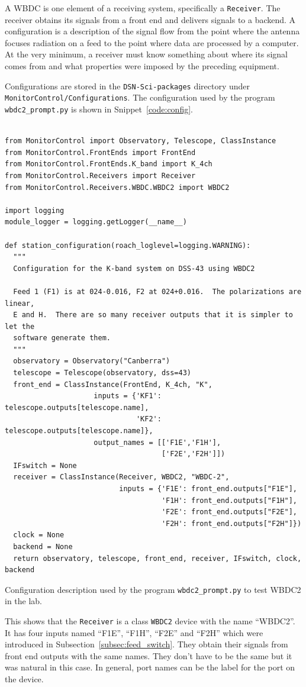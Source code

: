 \documentclass[letterpaper,11pt]{book}
\begin{document}
A WBDC is one element of a receiving system, specifically a {\tt Receiver}.  The
receiver obtains its signals from a front end and delivers signals to a 
backend.  A configuration is a description of the signal flow from the point
where the antenna focuses radiation on a feed to the point where data are
processed by a computer.  At the very minimum, a receiver must know something
about where its signal comes from and what properties were imposed by the
preceding equipment.

Configurations are stored in the {\tt DSN-Sci-packages} directory under\linebreak
{\tt MonitorControl/Configurations}.  The configuration used by the 
program {\tt wbdc2\_prompt.py} is shown in Snippet~\ref{code:config}.
\begin{code}[h!tb]
\begin{center}
\begin{verbatim}

from MonitorControl import Observatory, Telescope, ClassInstance
from MonitorControl.FrontEnds import FrontEnd
from MonitorControl.FrontEnds.K_band import K_4ch
from MonitorControl.Receivers import Receiver
from MonitorControl.Receivers.WBDC.WBDC2 import WBDC2

import logging
module_logger = logging.getLogger(__name__)

def station_configuration(roach_loglevel=logging.WARNING):
  """
  Configuration for the K-band system on DSS-43 using WBDC2

  Feed 1 (F1) is at 024-0.016, F2 at 024+0.016.  The polarizations are linear,
  E and H.  There are so many receiver outputs that it is simpler to let the
  software generate them.
  """
  observatory = Observatory("Canberra")
  telescope = Telescope(observatory, dss=43)
  front_end = ClassInstance(FrontEnd, K_4ch, "K",
                     inputs = {'KF1': telescope.outputs[telescope.name],
                               'KF2': telescope.outputs[telescope.name]},
                     output_names = [['F1E','F1H'],
                                     ['F2E','F2H']])
  IFswitch = None
  receiver = ClassInstance(Receiver, WBDC2, "WBDC-2",
                           inputs = {'F1E': front_end.outputs["F1E"],
                                     'F1H': front_end.outputs["F1H"],
                                     'F2E': front_end.outputs["F2E"],
                                     'F2H': front_end.outputs["F2H"]})
  clock = None
  backend = None
  return observatory, telescope, front_end, receiver, IFswitch, clock, backend\end{verbatim}
\caption[Configuration used by {\tt wbdc2\_prompt.py}]{\label{code:config}
Configuration description used by the program
{\tt wbdc2\_prompt.py} to test WBDC2 in the lab.}
\end{center}
\end{code}
This shows that the {\tt Receiver} is a class {\tt WBDC2} device with the name
``WBDC2''.  It has four inputs named ``F1E'', ``F1H'', ``F2E'' and
``F2H'' which were introduced in Subsection~\ref{subsec:feed_switch}. They
obtain their signals from front end outputs with the same names.  They
don't have to be the same but it was natural in this case.  In general, port
names can be the label for the port on the device.
\end{document}
